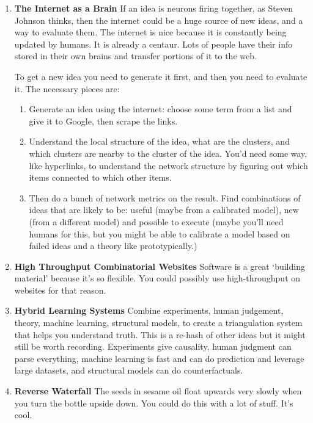 \documentclass[paper=a4, fontsize=11pt]{scrartcl} %
\numberwithin{equation}{section} %
\numberwithin{figure}{section} %
\numberwithin{table}{section} %
\begin{document}
\begin{enumerate}
\item \textbf{The Internet as a Brain} If an idea is neurons firing together, as Steven Johnson thinks, then the internet could be a huge source of new ideas, and a way to evaluate them.  The internet is nice because it is constantly being updated by humans.  It is already a centaur.  Lots of people have their info stored in their own brains and transfer portions of it to the web.  

To get a new idea you need to generate it first, and then you need to evaluate it.  The necessary pieces are:

\begin{enumerate}
\item Generate an idea using the internet: choose some term from a list and give it to Google, then scrape the links.
\item Understand the local structure of the idea, what are the clusters, and which clusters are nearby to the cluster of the idea.  You'd need some way, like hyperlinks, to understand the network structure by figuring out which items connected to which other items.  
\item Then do a bunch of network metrics on the result.  Find combinations of ideas that are likely to be: useful (maybe from a calibrated model), new (from a different model) and possible to execute (maybe you'll need humans for this, but you might be able to calibrate a model based on failed ideas and a theory like prototypically.)
\end{enumerate}

\item \textbf{High Throughput Combinatorial Websites} Software is a great `building material' because it's so flexible.  You could possibly use high-throughput on websites for that reason.

\item \textbf{Hybrid Learning Systems} Combine experiments, human judgement, theory, machine learning, structural models, to create a triangulation system that helps you understand truth.  This is a re-hash of other ideas but it might still be worth recording.  Experiments give causality, human judgment can parse everything, machine learning is fast and can do prediction and leverage large datasets, and structural models can do counterfactuals.

\item \textbf{Reverse Waterfall} The seeds in sesame oil float upwards very slowly when you turn the bottle upside down.  You could do this with a lot of stuff.  It's cool.  


\end{enumerate}
\end{document}
